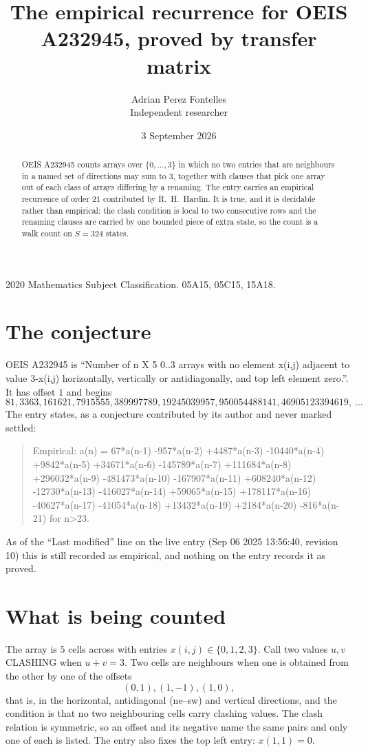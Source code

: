 \documentclass[11pt,a4paper]{article}
\title{The empirical recurrence for OEIS A232945, proved by transfer matrix}
\author{Adrian Perez Fontelles\\ \small Independent researcher}
\date{3 September 2026}
\theoremstyle{plain}
\theoremstyle{definition}
\begin{document}
\maketitle

\begin{abstract}
OEIS A232945 counts arrays over $\{0,\dots,3\}$ in which no two entries that are neighbours in
a named set of directions may sum to $3$, together with clauses that pick one array out of
each class of arrays differing by a renaming. The entry carries an empirical recurrence of
order $21$ contributed by R.~H.~Hardin. It is true, and it is decidable rather than
empirical: the clash condition is local to two consecutive rows and the renaming clauses are
carried by one bounded piece of extra state, so the count is a walk count on $S=324$ states.
\end{abstract}

\noindent\small 2020 Mathematics Subject Classification. 05A15, 05C15, 15A18.\normalsize

\section{The conjecture}

OEIS A232945 is ``Number of n X 5 0..3 arrays with no element x(i,j) adjacent to value 3-x(i,j) horizontally, vertically or antidiagonally, and top left element zero.''. It has offset $1$ and begins
\[
81, 3363, 161621, 7915555, 389997789, 19245039957, 950054488141, 46905123394619,\ \dots
\]
The entry states, as a conjecture contributed by its author and never marked settled:
\begin{quote}
Empirical: a(n) = 67*a(n-1) -957*a(n-2) +4487*a(n-3) -10440*a(n-4) +9842*a(n-5) +34671*a(n-6) -145789*a(n-7) +111684*a(n-8) +296032*a(n-9) -481473*a(n-10) -167907*a(n-11) +608240*a(n-12) -12730*a(n-13) -416027*a(n-14) +59065*a(n-15) +178117*a(n-16) -40627*a(n-17) -41054*a(n-18) +13432*a(n-19) +2184*a(n-20) -816*a(n-21) for n>23.
\end{quote}
As of the ``Last modified'' line on the live entry (Sep 06 2025 13:56:40, revision 10) this is still
recorded as empirical, and nothing on the entry records it as proved.

\section{What is being counted}

The array is $5$ cells across with entries $x(i,j)\in\{0,1,2,3\}$. Call two values $u,v$ CLASHING
when $u+v=3$. Two cells are neighbours when one is obtained from the other by one of
the offsets
\[
(0,1), (1,-1), (1,0),
\]
that is, in the horizontal, antidiagonal (ne--sw) and vertical directions, and the condition is that no two neighbouring cells carry
clashing values. The clash relation is symmetric, so an offset and its negative name the
same pairs and only one of each is listed. The entry also fixes the top left entry: $x(1,1)=0$.
\end{document}
